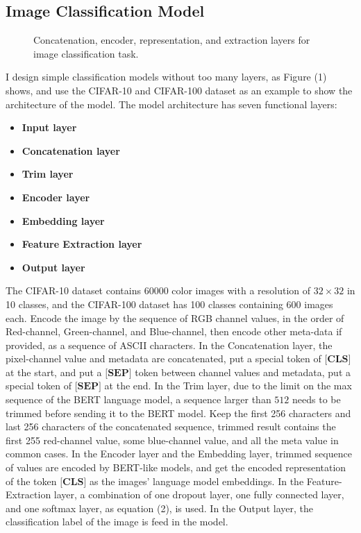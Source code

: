 \documentclass[review]{cvpr}
\begin{document}
\subsection{Image Classification Model}

\begin{figure*}
\begin{center}
\end{center}
   \caption{Concatenation, encoder, representation, and extraction layers for image classification task.}
\label{fig:short}
\end{figure*}

I design simple classification models without too many layers, as Figure (1) shows,
and use the CIFAR-10 and CIFAR-100 dataset as an example to show the architecture of the model.
The model architecture has seven functional layers:

\begin{itemize}
\item {\bf Input layer}
\item {\bf Concatenation layer}
\item {\bf Trim layer}
\item {\bf Encoder layer}
\item {\bf Embedding layer}
\item {\bf Feature Extraction layer}
\item {\bf Output layer}
\end{itemize}

\par The CIFAR-10 dataset contains 60000 color images with a resolution of $32\times32$ in 10 classes, and the CIFAR-100 dataset has 100 classes containing 600 images each.
Encode the image by the sequence of RGB channel values, in the order of Red-channel, Green-channel, and Blue-channel,
then encode other meta-data if provided, as a sequence of ASCII characters.
In the Concatenation layer, the pixel-channel value and metadata are concatenated, put a special token of $\textbf{[CLS]}$ at the start,
and put a $\textbf{[SEP]}$ token between channel values and metadata, put a special token of $\textbf{[SEP]}$ at the end.
In the Trim layer, due to the limit on the max sequence of the BERT language model, a sequence larger than $512$ needs to be trimmed before sending it to the BERT model.
Keep the first 256 characters and last 256 characters of the concatenated sequence, trimmed result contains the first 255 red-channel value,
some blue-channel value, and all the meta value in common cases.
In the Encoder layer and the Embedding layer, trimmed sequence of values are encoded by BERT-like models,
and get the encoded representation of the token $\textbf{[CLS]}$ as the images' language model embeddings.
In the Feature-Extraction layer, a combination of one dropout layer, one fully connected layer, and one softmax layer, as equation (2), is used.
In the Output layer, the classification label of the image is feed in the model.
\end{document}
